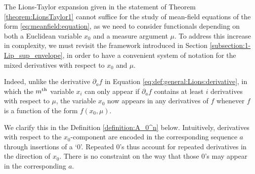 \documentclass[a4paper,11pt,twoside]{article}
\numberwithin{equation}{section}
\theoremstyle{plain}
\newcommand{\1}{\mathbbm{1}}
\begin{document}
	The Lions-Taylor expansion given in the statement of Theorem \ref{theorem:LionsTaylor1} cannot suffice for the study of mean-field equations of the form \eqref{eq:meanfield:equation}, as we need to consider functionals depending on both a Euclidean variable $x_0$ and a measure argument $\mu$. To address this increase in complexity, we must revisit the framework introduced in Section \ref{subsection:1-Lip_sup_envelope}, in order to have a convenient system of notation for the mixed derivatives with respect to $x_0$ and $\mu$. 
	
	Indeed, unlike the derivative $\partial_{a} f$ in Equation \eqref{eq:def:general:Lions:derivative}, in which the $m^{\rm th}$ variable $x_{i}$ can only appear if $\partial_{a} f$ contains at least $i$ derivatives with respect to $\mu$, the variable $x_0$ now appears in any derivatives of $f$ whenever $f$ is a function of the form $f(x_0,\mu)$.  
	
	We clarify this in the Definition \ref{definition:A_0^n} below. Intuitively, derivatives with respect to the $x_0$-component are encoded in the corresponding sequence $a$ through insertions of a `$0$'. Repeated $0$'s thus account for repeated derivatives in the direction of $x_0$. There is no constraint on the way that those $0$'s may appear in the corresponding $a$. 
	
\end{document}
